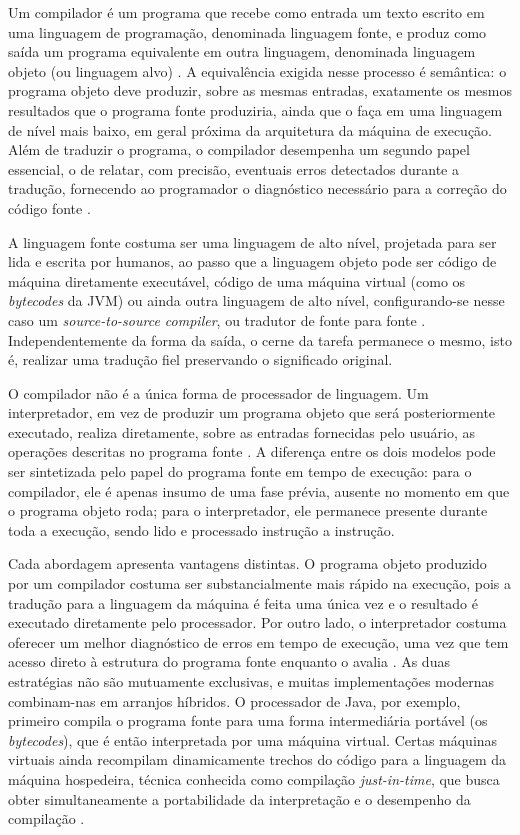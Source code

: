\documentclass[
    12pt
    ,oneside
    ,a4paper
    ,chapter=TITLE
    ,section=TITLE
    ,sumario=abnt-6027-2012]{abntex2}
\begin{document}
Um compilador é um programa que recebe como entrada um texto escrito em uma linguagem de
programação, denominada linguagem fonte, e produz como saída um programa equivalente em
outra linguagem, denominada linguagem objeto (ou linguagem alvo) \cite{aho2008}. A
equivalência exigida nesse processo é semântica: o programa objeto deve produzir, sobre as mesmas
entradas, exatamente os mesmos resultados que o programa fonte produziria, ainda que o faça em
uma linguagem de nível mais baixo, em geral próxima da arquitetura da máquina de execução. Além
de traduzir o programa, o compilador desempenha um segundo papel essencial, o de relatar, com
precisão, eventuais erros detectados durante a tradução, fornecendo ao programador o diagnóstico
necessário para a correção do código fonte \cite{aho2008}.

A linguagem fonte costuma ser uma linguagem de alto nível, projetada para ser lida e escrita por
humanos, ao passo que a linguagem objeto pode ser código de máquina diretamente executável,
código de uma máquina virtual (como os \textit{bytecodes} da JVM) ou ainda outra linguagem de
alto nível, configurando-se nesse caso um \textit{source-to-source compiler}, ou tradutor de
fonte para fonte \cite{aho2008}. Independentemente da forma da saída, o cerne da tarefa permanece
o mesmo, isto é, realizar uma tradução fiel preservando o significado original.

O compilador não é a única forma de processador de linguagem. Um interpretador, em vez
de produzir um programa objeto que será posteriormente executado, realiza diretamente, sobre as
entradas fornecidas pelo usuário, as operações descritas no programa fonte \cite{aho2008}. A
diferença entre os dois modelos pode ser sintetizada pelo papel do programa fonte em tempo de
execução: para o compilador, ele é apenas insumo de uma fase prévia, ausente no momento em que o
programa objeto roda; para o interpretador, ele permanece presente durante toda a execução,
sendo lido e processado instrução a instrução.

Cada abordagem apresenta vantagens distintas. O programa objeto produzido por um compilador
costuma ser substancialmente mais rápido na execução, pois a tradução para a linguagem da máquina
é feita uma única vez e o resultado é executado diretamente pelo processador. Por outro lado, o
interpretador costuma oferecer um melhor diagnóstico de erros em tempo de execução, uma vez que
tem acesso direto à estrutura do programa fonte enquanto o avalia \cite{aho2008}. As duas
estratégias não são mutuamente exclusivas, e muitas implementações modernas combinam-nas em
arranjos híbridos. O processador de Java, por exemplo, primeiro compila o programa fonte para
uma forma intermediária portável (os \textit{bytecodes}), que é então interpretada por uma
máquina virtual. Certas máquinas virtuais ainda recompilam dinamicamente trechos do código para
a linguagem da máquina hospedeira, técnica conhecida como compilação \textit{just-in-time}, que
busca obter simultaneamente a portabilidade da interpretação e o desempenho da compilação
\cite{aho2008}.
\end{document}
